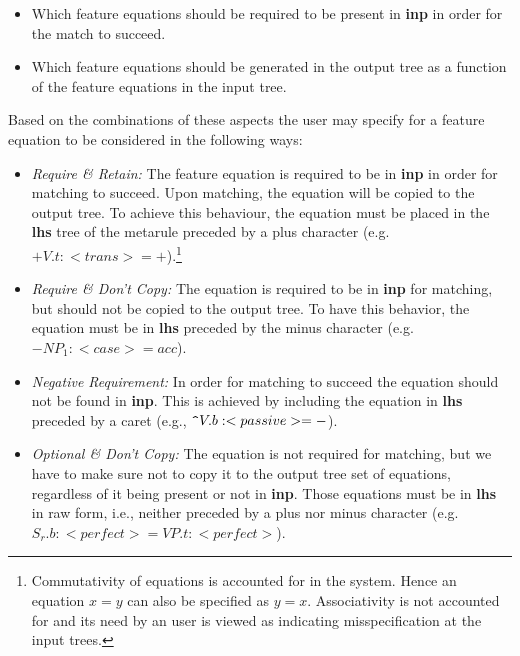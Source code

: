 \begin{itemize}
\item   Which feature equations should be required to be present in {\bf inp}
        in order for the match to succeed.

\item   Which feature equations should be generated in the output tree as a 
        function of the feature equations in the input tree.
\end{itemize}

Based on the combinations of these aspects the user may specify for a feature
equation to be considered in the following ways:

\begin{itemize}
\item   {\it Require \& Retain:} The feature equation
        is required to be in {\bf inp} in order for matching to succeed.
        Upon matching, the equation will be copied to the output tree.
        To achieve this behaviour, the equation must be placed in 
        the {\bf lhs} tree of the metarule preceded by a plus character
        (e.g. $+V.t:<trans>=+$).\footnote{Commutativity of equations is 
        accounted for in the system. Hence an equation $x=y$ can also be
        specified as $y=x$. Associativity is not accounted for and its need by
        an user is viewed as indicating misspecification at the input trees.}
        
\item   {\it Require \& Don't Copy:} The equation is required to be in 
        {\bf inp}
        for matching, but should not be copied to the output tree.
        To have this behavior, the equation must be in {\bf lhs} preceded 
	by the minus character
        (e.g. $-NP_1:<case>=acc$).

\item	{\it Negative Requirement:} In order for matching to succeed the 
	equation should not be found in {\bf inp}. This is achieved by
	including the equation in {\bf lhs} preceded by a caret
	(e.g., $\verb|^|V.b:<passive>=-$).

\item   {\it Optional \& Don't Copy:} 
        The equation is not required for matching,
        but we have to make sure not to copy it to the output tree set of
        equations, regardless of it being present or not in {\bf inp}.
        Those equations must be in {\bf lhs} in raw form, i.e., neither preceded
        by a plus nor minus character
        (e.g. $S_r.b:<perfect>=VP.t:<perfect>$).


\end{itemize}
